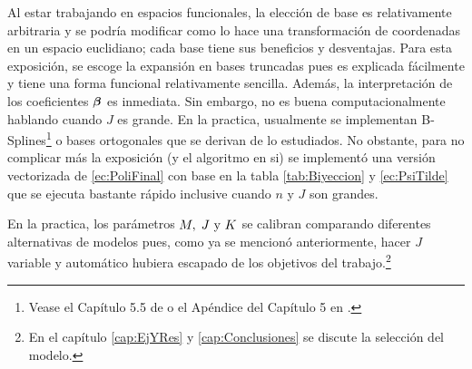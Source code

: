\documentclass[../Main/Main.tex]{subfiles}
\begin{document}

Al estar trabajando en espacios funcionales, la elección de base es relativamente arbitraria y se podría modificar como lo hace una transformación de coordenadas en un espacio euclidiano; cada base tiene sus beneficios y desventajas. Para esta exposición, se escoge la expansión en bases truncadas pues es explicada fácilmente y tiene una forma funcional relativamente sencilla. Además, la interpretación de los coeficientes $\bm{\beta}$ es inmediata. Sin embargo, no es buena computacionalmente hablando cuando $J$ es grande. En la practica, usualmente se implementan B-Splines\footnote{Vease el Capítulo 5.5 de \citet{wasserman2007all} o el Apéndice del Capítulo 5 en \citet{hastie2008elements}.} o bases ortogonales que se derivan de lo estudiados. No obstante, para no complicar más la exposición (y el algoritmo en si) se implementó una versión vectorizada de \eqref{ec:PoliFinal} con base en la tabla \ref{tab:Biyeccion} y \eqref{ec:PsiTilde} que se ejecuta bastante rápido inclusive cuando $n$ y $J$ son grandes.

En la practica, los parámetros $M,\;J\text{ y }K$ se calibran comparando diferentes alternativas de modelos pues, como ya se mencionó anteriormente, hacer $J$ variable y automático hubiera escapado de los objetivos del trabajo.\footnote{En el capítulo \ref{cap:EjYRes} y \ref{cap:Conclusiones} se discute la selección del modelo.}
\end{document}
